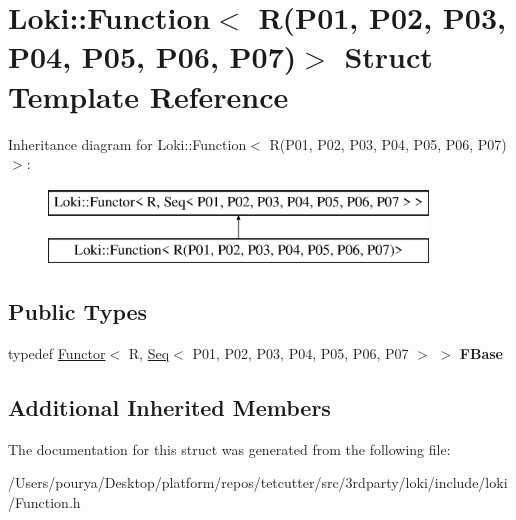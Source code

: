 \hypertarget{structLoki_1_1Function_3_01R_07P01_00_01P02_00_01P03_00_01P04_00_01P05_00_01P06_00_01P07_08_4}{}\section{Loki\+:\+:Function$<$ R(P01, P02, P03, P04, P05, P06, P07)$>$ Struct Template Reference}
\label{structLoki_1_1Function_3_01R_07P01_00_01P02_00_01P03_00_01P04_00_01P05_00_01P06_00_01P07_08_4}
Inheritance diagram for Loki\+:\+:Function$<$ R(P01, P02, P03, P04, P05, P06, P07)$>$\+:\begin{figure}[H]
\begin{center}
\leavevmode
\includegraphics[height=2.000000cm]{structLoki_1_1Function_3_01R_07P01_00_01P02_00_01P03_00_01P04_00_01P05_00_01P06_00_01P07_08_4}
\end{center}
\end{figure}
\subsection*{Public Types}
\begin{DoxyCompactItemize}
\item 
\hypertarget{structLoki_1_1Function_3_01R_07P01_00_01P02_00_01P03_00_01P04_00_01P05_00_01P06_00_01P07_08_4_a166c9adf3f4a1102a56e680860360e1a}{}typedef \hyperlink{classLoki_1_1Functor}{Functor}$<$ R, \hyperlink{structLoki_1_1Seq}{Seq}$<$ P01, P02, P03, P04, P05, P06, P07 $>$ $>$ {\bfseries F\+Base}\label{structLoki_1_1Function_3_01R_07P01_00_01P02_00_01P03_00_01P04_00_01P05_00_01P06_00_01P07_08_4_a166c9adf3f4a1102a56e680860360e1a}

\end{DoxyCompactItemize}
\subsection*{Additional Inherited Members}


The documentation for this struct was generated from the following file\+:\begin{DoxyCompactItemize}
\item 
/\+Users/pourya/\+Desktop/platform/repos/tetcutter/src/3rdparty/loki/include/loki/Function.\+h\end{DoxyCompactItemize}
